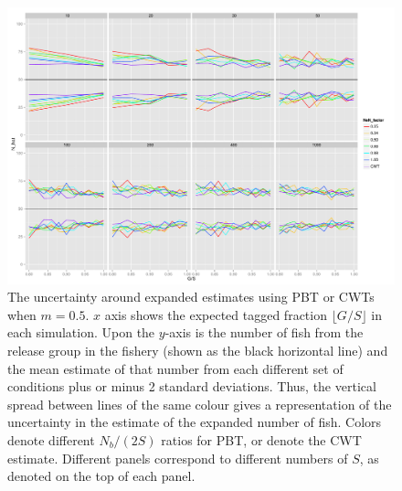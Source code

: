 \documentclass[11pt]{article}
\begin{document}
\begin{figure}
\includegraphics[width = .93\textwidth]{./images/sd_line_horns_m_0_5.pdf}
\caption{The uncertainty around expanded estimates using PBT or CWTs when $m = 0.5$.  $x$ axis shows the
expected tagged fraction $\lfloor G/S \rfloor$ in each simulation. Upon the $y$-axis is the number of fish from the
release group in the fishery (shown as the black horizontal line) and the mean estimate of that number from each different set of 
conditions plus or minus 2 standard deviations.  Thus, the vertical spread between lines of the same colour gives a representation
of the uncertainty in the estimate of the expanded number of fish. Colors denote different $N_b/(2S)$ ratios for PBT, or denote
the CWT estimate.  Different
panels correspond to different numbers of $S$, as denoted on the top of each panel.
\label{fig:horn0.5}}
\end{figure}
\end{document}
